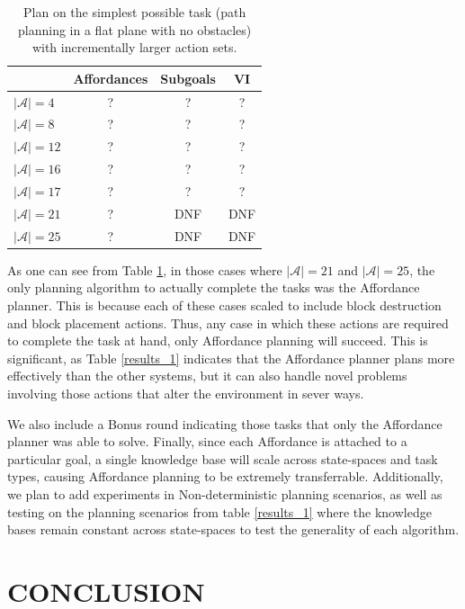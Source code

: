 \documentclass[]{article}
\begin{document}
\begin{table}
\begin{tabular}{ l || c | c | c }
  & Affordances & Subgoals & VI \\
  \hline
  $|\mathcal{A}| = 4$ 		& 	? 	& 	? 		& ?  \\
  $|\mathcal{A}| = 8$ 		& 	? 	& 	? 		& ?  \\
  $|\mathcal{A}| = 12$ 	& 	? 	& 	? 		& ?  \\
  $|\mathcal{A}| = 16$ 	& 	? 	& 	? 		& ?  \\
  $|\mathcal{A}| = 17$ 	& 	? 	& 	? 		& ?  \\
  $|\mathcal{A}| = 21$ 	& 	? 	& 	DNF 		& DNF  \\
  $|\mathcal{A}| = 25$ 	& 	? 	& 	DNF 		& DNF  \\
\end{tabular}
\label{results_2}
\caption{Plan on the simplest possible task (path planning in a flat plane with no obstacles) with incrementally larger action sets.}
\end{table}

As one can see from Table \ref{results_2}, in those cases where
$|\mathcal{A}| = 21$ and $|\mathcal{A}| = 25$, the only planning algorithm to
actually complete the tasks was the Affordance planner. This is because each
of these cases scaled to include block destruction and block placement actions.
Thus, any case in which these actions are required to complete the task at hand,
only Affordance planning will succeed. This is significant, as Table \ref{results_1}
indicates that the Affordance planner plans more effectively than the other
systems, but it can also handle novel problems involving those actions that
alter the environment in sever ways.

We also include a Bonus round indicating
those tasks that only the Affordance planner was able to solve. Finally, since
each Affordance is attached to a particular goal, a single knowledge base will
scale across state-spaces and task types, causing Affordance planning to be
extremely transferrable. Additionally, we plan to add experiments in
Non-deterministic planning scenarios, as well as testing on the planning scenarios
from table \ref{results_1} where the knowledge bases remain constant across
state-spaces to test the generality of each algorithm.




\section{CONCLUSION}
\end{document}
